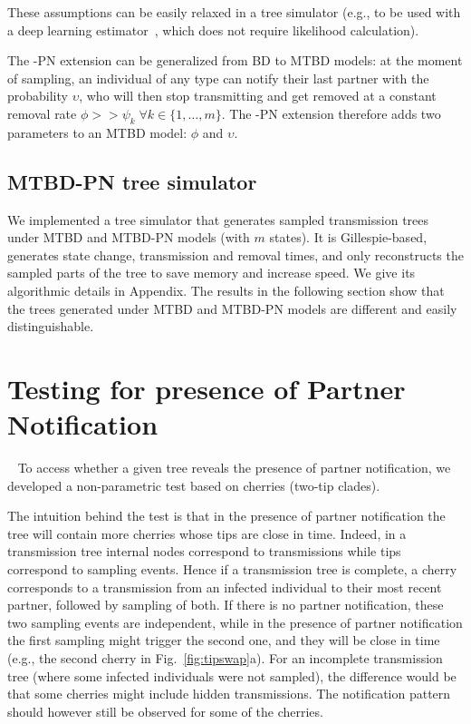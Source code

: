 \documentclass[a4paper,10pt]{article}
\begin{document}
These assumptions can be easily relaxed in a tree simulator (e.g., to be used with a deep learning estimator~\citep{Voznica2021}, which does not require likelihood calculation).


The -PN extension can be generalized from BD to MTBD models: at the moment of sampling, an individual of any type can notify their last partner with the probability $\upsilon$, who will then stop transmitting and get removed at a constant removal rate $\phi >> \psi_k \; \forall k \in \{1, \ldots, m\}$. The -PN extension therefore adds two parameters to an MTBD model: $\phi$ and $\upsilon$.

\subsection{MTBD-PN tree simulator}

We implemented a tree simulator that generates sampled transmission trees under MTBD and MTBD-PN models (with $m$ states). It is Gillespie-based, generates state change, transmission and removal times, and only reconstructs the sampled parts of the tree to save memory and increase speed.
We give its algorithmic details in Appendix. The results in the following section show that the trees generated under MTBD and MTBD-PN models are different and easily distinguishable.



\section{Testing for presence of Partner Notification}~\label{sec:test}
To access whether a given tree reveals the presence of partner notification, we developed a non-parametric test based on cherries (two-tip clades). 

The intuition behind the test is that in the presence of partner notification the tree will contain more cherries whose tips are close in time. Indeed, in a transmission tree internal nodes correspond to transmissions while tips correspond to sampling events. Hence if a transmission tree is complete, a cherry corresponds to a transmission from an infected individual to their most recent partner, followed by sampling of both. If there is no partner notification, these two sampling events are independent, while in the presence of partner notification the first sampling might trigger the second one, and they will be close in time (e.g., the second cherry in Fig.~\ref{fig:tipswap}a). For an incomplete transmission tree (where some infected individuals were not sampled), the difference would be that some cherries might include hidden transmissions. The notification pattern should however still be observed for some of the cherries.
\end{document}
